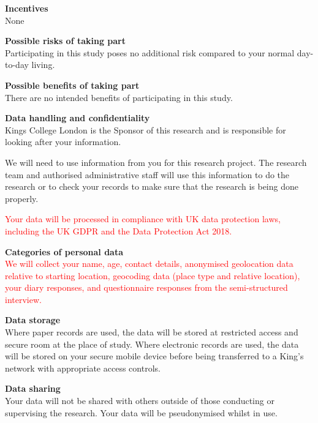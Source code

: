 \documentclass[12pt]{article}
\newcommand{\chg}[1]{\textcolor{red}{#1}}
\begin{document}
\vspace{1.25em}
\noindent\textbf{Incentives}\\
None

\vspace{1.25em}
\noindent\textbf{Possible risks of taking part}\\
Participating in this study poses no additional risk compared to your normal day-to-day living.

\vspace{1.25em}
\noindent\textbf{Possible benefits of taking part}\\
There are no intended benefits of participating in this study.

\vspace{1.25em}
\noindent\textbf{Data handling and confidentiality}\\
Kings College London is the Sponsor of this research and is responsible for looking after your information.

We will need to use information from you for this research project. The research team and authorised administrative staff will use this information to do the research or to check your records to make sure that the research is being done properly.

\chg{Your data will be processed in compliance with UK data protection laws, including the UK GDPR and the Data Protection Act 2018.}

\vspace{0.75em}
\noindent\textbf{Categories of personal data}\\
\chg{We will collect your name, age, contact details, anonymised geolocation data relative to starting location, geocoding data (place type and relative location), your diary responses, and questionnaire responses from the semi-structured interview.}

\vspace{1.25em}
\noindent\textbf{Data storage}\\
Where paper records are used, the data will be stored at restricted access and secure room at the place of study. Where electronic records are used, the data will be stored on your secure mobile device before being transferred to a King's network with appropriate access controls.

\vspace{1.25em}
\noindent\textbf{Data sharing}\\
Your data will not be shared with others outside of those conducting or supervising the research. Your data will be pseudonymised whilst in use.
\end{document}
